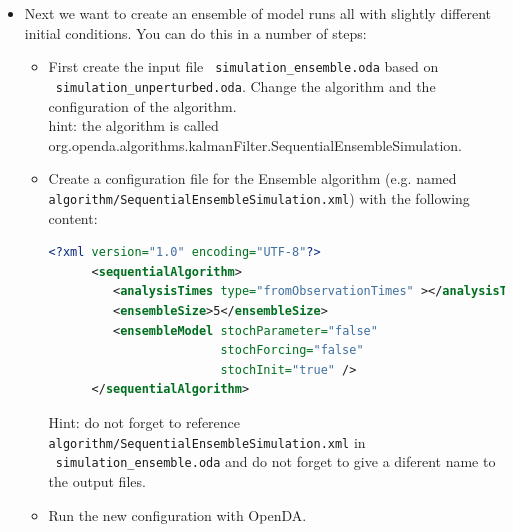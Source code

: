 \begin{itemize}
      To create a movie with both results in python type:
      \begin{lstlisting}[language=Python,frame=single,caption={Python initialize}]
      import simulation_unperturbed_results as unperturbed
      import simulation_perturbed_results as perturbed
      p.plot_movie(unperturbed.model_time,unperturbed.x,perturbed.x)
      \end{lstlisting}

      To create a time-series plot with both results in Python type:
      \begin{lstlisting}[language=Python,frame=single,caption={Python}]
      plt.subplot(2,1,1)
      plt.plot(unperturbed.model_time,unperturbed.x[:,0],'b') #python counts starting at 0
      plt.plot(perturbed.model_time,perturbed.x[:,0],'g') #python counts starting at 0
      plt.ylabel(r'$\theta_1$') # use raw string and latex for label
      plt.subplot(2,1,2)
      plt.plot(unperturbed.model_time,unperturbed.x[:,1],'b')
      plt.plot(perturbed.model_time,perturbed.x[:,1],'g')
      plt.ylabel(r'$\theta_2$')
      plt.show() 
      \end{lstlisting}
      
\item Next we want to create an ensemble of model runs all with slightly different initial conditions. 
      You can do this in a number of steps:
      \begin{itemize}
      \item First create the input file \texttt{ simulation\_ensemble.oda} based on\\
            \texttt{ simulation\_unperturbed.oda}. Change the algorithm and the
            configuration of the algorithm.\\
            hint: the algorithm is called \\
            org.openda.algorithms.kalmanFilter.SequentialEnsembleSimulation.
      \item Create a configuration file for the Ensemble algorithm (e.g. named
            \texttt{ algorithm/SequentialEnsembleSimulation.xml}) with the following content:
      \begin{lstlisting}[language=XML,frame=single,caption={XML-input for sequentialAlgorithm}]
      <?xml version="1.0" encoding="UTF-8"?>
      <sequentialAlgorithm>
         <analysisTimes type="fromObservationTimes" ></analysisTimes>
         <ensembleSize>5</ensembleSize>
         <ensembleModel stochParameter="false"
                        stochForcing="false"
                        stochInit="true" />
      </sequentialAlgorithm>
      \end{lstlisting}
      Hint: do not forget to reference \texttt{ algorithm/SequentialEnsembleSimulation.xml} in \\ \texttt{ simulation\_ensemble.oda}
      and do not forget to give a diferent name to the output files.
      \item Run the new configuration with OpenDA.


\end{itemize}
\end{itemize}
